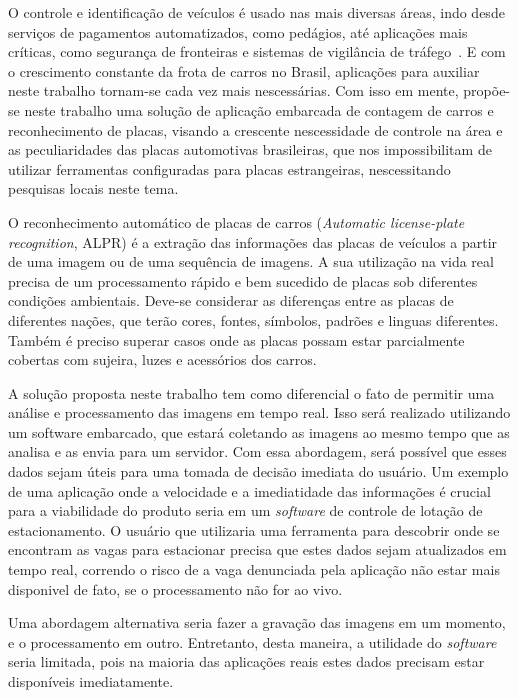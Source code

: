 
O controle e identificação de veículos é usado nas mais diversas áreas, indo
desde serviços de pagamentos automatizados, como pedágios, até aplicações mais
críticas, como segurança de fronteiras e sistemas de vigilância de
tráfego~\cite{ahmad2015automatic}. E com o crescimento constante da frota de
carros no Brasil, aplicações para auxiliar neste trabalho tornam-se cada vez
mais nescessárias. Com isso em mente, propõe-se neste trabalho uma solução de
aplicação embarcada de contagem de carros e reconhecimento de placas, visando a
crescente nescessidade de controle na área e as peculiaridades das placas
automotivas brasileiras, que nos impossibilitam de utilizar ferramentas
configuradas para placas estrangeiras, nescessitando pesquisas locais neste tema.

O reconhecimento automático de placas de carros (\emph{Automatic license-plate recognition}, ALPR) 
é a extração das informações das placas de veículos a partir de uma imagem ou de uma 
sequência de imagens. A sua utilização na vida real precisa de um processamento rápido e
bem sucedido de placas sob diferentes condições ambientais. Deve-se considerar as
diferenças entre as placas de diferentes nações, que terão cores, fontes, símbolos, padrões e
linguas diferentes. Também é preciso superar casos onde as placas possam estar 
parcialmente cobertas com sujeira, luzes e acessórios dos carros.~\cite{s2013automatic}

A solução proposta neste trabalho tem como diferencial o fato de permitir uma
análise e processamento das imagens em tempo real. Isso será realizado
utilizando um software embarcado, que estará coletando as imagens ao mesmo tempo
que as analisa e as envia para um servidor. Com essa abordagem, será possível 
que esses dados sejam úteis para uma tomada de decisão imediata do usuário. Um exemplo de
uma aplicação onde a velocidade e a imediatidade das informações é crucial para a viabilidade
do produto seria em um \emph{software} de controle de lotação de estacionamento. O usuário que
utilizaria uma ferramenta para descobrir onde se encontram as vagas para estacionar precisa
que estes dados sejam atualizados em tempo real, correndo o risco de a vaga denunciada pela
aplicação não estar mais disponivel de fato, se o processamento não for ao vivo.

Uma abordagem alternativa seria fazer a gravação das imagens em um momento, e o 
processamento em outro. Entretanto, desta maneira, a utilidade do \emph{software} seria limitada,
pois na maioria das aplicações reais estes dados precisam estar disponíveis imediatamente.

